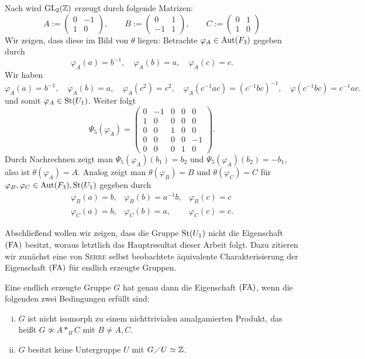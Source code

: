 \begin{beweis}
	Nach \cite[Theorem 23.1]{Zieschang} wird $\operatorname{GL}_2(\mathbb{Z})$ erzeugt durch folgende Matrizen:
	\[
		A := \begin{pmatrix}
			0 & -1 \\
			1 & 0
		\end{pmatrix}, \qquad 
		B := \begin{pmatrix}
			0  & 1 \\
			-1 & 1
		\end{pmatrix}, \qquad 
		C := \begin{pmatrix}
			0 & 1 \\
			1 & 0
		\end{pmatrix}
	\]
	Wir zeigen, dass diese im Bild von $\theta$ liegen: Betrachte $\varphi_A \in \operatorname{Aut}(F_3)$ gegeben durch
	\[
		\varphi_A(a) = b^{-1}, \quad \varphi_A(b) = a, \quad \varphi_A(c) = c.
	\]
	Wir haben
	\[
		\varphi_A(a) = b^{-1}, \quad \varphi_A(b) = a, \quad \varphi_A(c^2) = c^2, \quad \varphi_A(c^{-1}ac) = (c^{-1}bc)^{-1}, \quad \varphi(c^{-1}bc) = c^{-1}ac.
	\]
	und somit $\varphi_A \in \operatorname{St}(U_1)$. Weiter folgt
	\[
		\Psi_5(\varphi_A) = \begin{pmatrix}
			0 & -1 & 0 & 0 & 0  \\
			1 & 0  & 0 & 0 & 0  \\
			0 & 0  & 1 & 0 & 0  \\
			0 & 0  & 0 & 0 & -1 \\
			0 & 0  & 0 & 1 & 0
		\end{pmatrix}.
	\]
	Durch Nachrechnen zeigt man $\Psi_5(\varphi_A)(b_1) = b_2$ und $\Psi_5(\varphi_A)(b_2) = -b_1$, also ist $\theta(\varphi_A) = A$. Analog zeigt man $\theta(\varphi_B) = B$ und $\theta(\varphi_C) = C$ für $\varphi_B, \varphi_C \in \operatorname{Aut}(F_3), \operatorname{St}(U_1)$ gegeben durch
	\[
		\begin{array}{lllll}
		\varphi_B(a) = b, & \varphi_B(b) = a^{-1}b,  & \varphi_B(c) = c \\ 
		\varphi_C(a) = b, & \varphi_C(b) = a,  & \varphi_C(c) = c.
		\end{array} 
	\]
\end{beweis}

Abschließend wollen wir zeigen, dass die Gruppe $\operatorname{St}(U_1)$ nicht die Eigenschaft $\operatorname{(FA)}$ besitzt, woraus letztlich das Hauptresultat dieser Arbeit folgt. Dazu zitieren wir zunächst eine von \textsc{Serre} selbst beobachtete äquivalente Charakterisierung der Eigenschaft $\operatorname{(FA)}$ für endlich erzeugte Gruppen.

\begin{satz}
\label{satz_char_FA}
	Eine endlich erzeugte Gruppe $G$ hat genau dann die Eigenschaft $\operatorname{(FA)}$, wenn die folgenden zwei Bedingungen erfüllt sind:
	\begin{enumerate}[(i)]
		\item $G$ ist nicht isomorph zu einem nichttrivialen amalgamierten Produkt, das heißt $G \not\simeq A *_B C$ mit $B \neq A, C$.
		\item $G$ besitzt keine Untergruppe $U$ mit $G \diagup U \simeq \mathbb{Z}$.
	\end{enumerate}
\end{satz}

